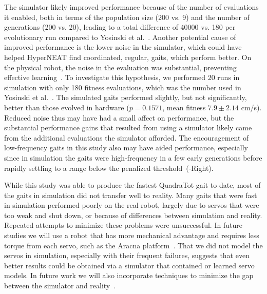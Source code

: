 The simulator likely improved performance because of the number of evaluations it enabled, both in terms of the population size (200 vs. 9) and the number of generations (200 vs. 20), leading
to a total difference of 40000 vs. 180 per evolutionary run compared to Yosinski et al.~\cite{yos:clune}. Another
potential cause of improved performance is the lower noise in the simulator, which could have helped HyperNEAT find coordinated, regular, gaits, which perform better. On the physical robot, the noise in the evaluation was
substantial, preventing effective learning~\cite{yos:clune}. 
To investigate this hypothesis, we performed 20 runs in simulation with only 180 fitness evaluations, which was the number used in Yosinski et al.~\cite{yos:clune}. The simulated gaits performed
slightly, but not significantly, better than those evolved in hardware ($p = 0.1571$, mean fitness $7.9 \pm 2.14$ cm/s).
Reduced noise thus may have had a small affect on performance, but the substantial performance gains that resulted from using a simulator likely came from the additional evaluations the simulator afforded.
The encouragement of low-frequency gaits in this study
also may have aided performance, especially since in simulation the gaits were
high-frequency in a few early generations before rapidly settling to a
 range below the penalized threshold~(-Right).



While this study was able to produce the fastest QuadraTot gait to
date, most of the gaits in simulation did not transfer well to
reality. Many gaits that were fast in simulation performed
poorly on the real robot, largely due to servos that were too weak and
shut down, or because of differences between simulation and
reality. Repeated attempts to minimize these problems were
unsuccessful. 
In future studies we will use a
robot that has more mechanical advantage and requires less torque from
each servo, such as the Aracna platform~\cite{lohmann2012aracna}.
That we did not model the servos in simulation, especially with their frequent failures, suggests that even better results could be obtained via a simulator that contained or learned servo models. In future work we will also incorporate techniques to minimize the gap between the simulator and reality~\cite{bongard,zagal,koos2011transferability}.
